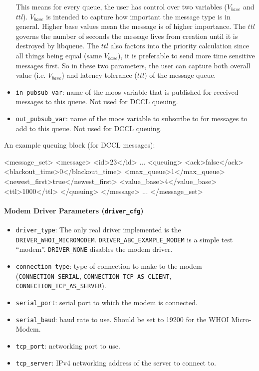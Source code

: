 \documentclass[11pt, letterpaper, oneside]{memoir}
\begin{document}
\begin{itemize}
This means for every queue, the user has control over two variables ($V_{base}$ and $ttl$). $V_{base}$ is intended to capture how important the message type is in general. Higher base values mean the message is of higher importance. The $ttl$ governs the number of seconds the message lives from creation until it is destroyed by libqueue. The $ttl$ also factors into the priority calculation since all things being equal (same $V_{base}$), it is preferable to send more time sensitive messages first. So in these two parameters, the user can capture both overall value (i.e. $V_{base}$) and latency tolerance ($ttl$) of the message queue.

\item \verb|in_pubsub_var|: name of the moos variable that is published for received messages to this queue. Not used for DCCL queuing.
\item \verb|out_pubsub_var|: name of the moos variable to subscribe to for
  messages to add to this queue. Not used for DCCL queuing.
\end{itemize}

An example queuing block (for DCCL messages):
\begin{small}
\begin{boxedverbatim}
<message_set>
  <message>
    <id>23</id>
    ...
    <queuing>
      <ack>false</ack>
      <blackout_time>0</blackout_time>
      <max_queue>1</max_queue>
      <newest_first>true</newest_first>
      <value_base>4</value_base>
      <ttl>1000</ttl>
    </queuing>
  </message>
  ...
</message_set>
\end{boxedverbatim}
\resetbvlinenumber
\end{small}

\paragraph{Modem Driver Parameters (\texttt{driver\_cfg})}
\begin{itemize}
\item \verb|driver_type|: The only real driver implemented is the \verb|DRIVER_WHOI_MICROMODEM|. \verb|DRIVER_ABC_EXAMPLE_MODEM| is a simple test ``modem''. \verb|DRIVER_NONE| disables the modem driver.
\item \verb|connection_type|: type of connection to make to the modem (\verb|CONNECTION_SERIAL|, \verb|CONNECTION_TCP_AS_CLIENT|, \verb|CONNECTION_TCP_AS_SERVER|).
\item \verb|serial_port|: serial port to which the modem is connected.
\item \verb|serial_baud|: baud rate to use. Should be set to 19200 for the WHOI Micro-Modem.
\item \verb|tcp_port|: networking port to use. 
\item \verb|tcp_server|: IPv4 networking address of the server to connect to. 
\end{itemize}
\end{document}

